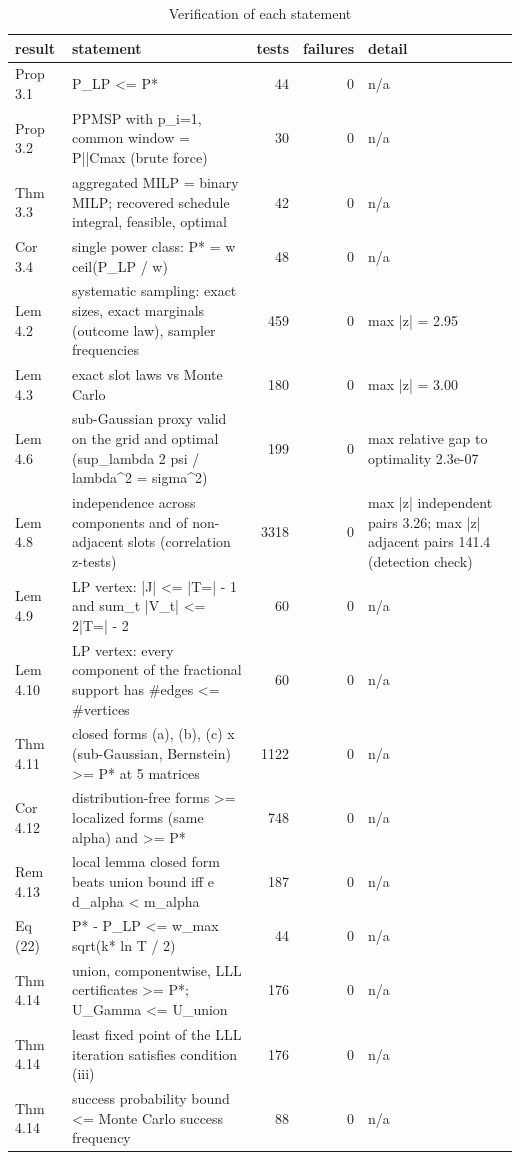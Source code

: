 \begin{table}[htbp]
\centering
\small
\caption{Verification of each statement}
\label{tab:theory_verification}
\begin{tabular}{llrrl}
\toprule
result & statement & tests & failures & detail \\
\midrule
Prop 3.1 & P\_LP <= P* & 44 & 0 & n/a \\
Prop 3.2 & PPMSP with p\_i=1, common window = P||Cmax (brute force) & 30 & 0 & n/a \\
Thm 3.3 & aggregated MILP = binary MILP; recovered schedule integral, feasible, optimal & 42 & 0 & n/a \\
Cor 3.4 & single power class: P* = w ceil(P\_LP / w) & 48 & 0 & n/a \\
Lem 4.2 & systematic sampling: exact sizes, exact marginals (outcome law), sampler frequencies & 459 & 0 & max |z| = 2.95 \\
Lem 4.3 & exact slot laws vs Monte Carlo & 180 & 0 & max |z| = 3.00 \\
Lem 4.6 & sub-Gaussian proxy valid on the grid and optimal (sup\_lambda 2 psi / lambda^2 = sigma^2) & 199 & 0 & max relative gap to optimality 2.3e-07 \\
Lem 4.8 & independence across components and of non-adjacent slots (correlation z-tests) & 3318 & 0 & max |z| independent pairs 3.26; max |z| adjacent pairs 141.4 (detection check) \\
Lem 4.9 & LP vertex: |J| <= |T=| - 1 and sum\_t |V\_t| <= 2|T=| - 2 & 60 & 0 & n/a \\
Lem 4.10 & LP vertex: every component of the fractional support has \#edges <= \#vertices & 60 & 0 & n/a \\
Thm 4.11 & closed forms (a), (b), (c) x (sub-Gaussian, Bernstein) >= P* at 5 matrices & 1122 & 0 & n/a \\
Cor 4.12 & distribution-free forms >= localized forms (same alpha) and >= P* & 748 & 0 & n/a \\
Rem 4.13 & local lemma closed form beats union bound iff e d\_alpha < m\_alpha & 187 & 0 & n/a \\
Eq (22) & P* - P\_LP <= w\_max sqrt(k* ln T / 2) & 44 & 0 & n/a \\
Thm 4.14 & union, componentwise, LLL certificates >= P*; U\_Gamma <= U\_union & 176 & 0 & n/a \\
Thm 4.14 & least fixed point of the LLL iteration satisfies condition (iii) & 176 & 0 & n/a \\
Thm 4.14 & success probability bound <= Monte Carlo success frequency & 88 & 0 & n/a \\

\end{tabular}
\end{table}
